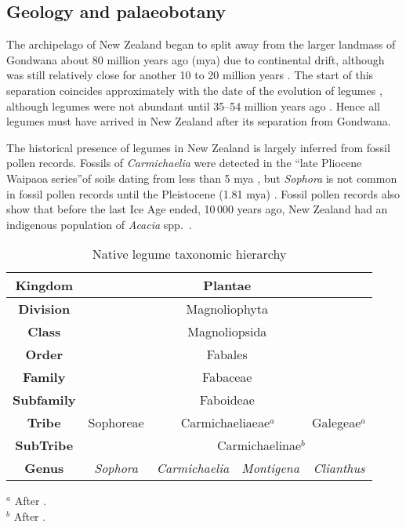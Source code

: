 \subsection{Geology and palaeobotany}

The archipelago of New Zealand began to split away from the larger
landmass of Gondwana about 80 million years ago (mya) due to
continental drift, although was still relatively close for another
10 to 20 million years \citep{Cooper93,Stevens95}. The start of this
separation coincides approximately with the date of the evolution of
legumes \citep{Sprent94}, although legumes were not abundant until
35--54 million years ago  \citep{Doyle03}. Hence all legumes must
have arrived in New Zealand after its separation from Gondwana.

The historical presence of legumes in New Zealand is largely
inferred from fossil pollen records. Fossils of \emph{Carmichaelia}
were detected in  the ``late Pliocene Waipaoa series''of soils
dating from less than 5 mya \citep{Oliver28}, but \emph{Sophora} is
not common in fossil pollen records until the Pleistocene (1.81 mya)
\citep{Hurr99}. Fossil pollen records also show that before the last
Ice Age ended, 10\,000 years ago, New Zealand had an indigenous
population of \emph{Acacia} spp.~\citep{Mildenhall72,Lee01}.

\begin{table} [tbp]
\caption{Native legume taxonomic hierarchy}
  \centering
  \begin{tabular}{|c|c|c|c|c|}
    \hline \textbf{Kingdom}     & \multicolumn{4}{c|}{Plantae} \\
    \hline \textbf{Division}    & \multicolumn{4}{c|}{Magnoliophyta} \\
    \hline \textbf{Class}       & \multicolumn{4}{c|}{Magnoliopsida} \\
    \hline \textbf{Order}       & \multicolumn{4}{c|}{Fabales} \\
    \hline \textbf{Family}      & \multicolumn{4}{c|}{Fabaceae} \\
    \hline \textbf{Subfamily}   & \multicolumn{4}{c|}{Faboideae} \\
    \hline \textbf{Tribe}       & Sophoreae         & \multicolumn{2}{c|}{Carmichaeliaeae$^a$} & Galegeae$^a$    \\
    \hline \textbf{SubTribe}    &                   & \multicolumn{3}{c|}{Carmichaelinae$^b$}              \\
    \hline \textbf{Genus}       & \emph{Sophora}    & \emph{Carmichaelia} & \emph{Montigena} & \emph{Clianthus}  \\
    \hline
  \end{tabular}

   \label{taxbox-Native}
  \medskip
  \raggedright
  {\footnotesize
\hskip 1cm $^a$ After \citet{Pohill81-Carm}. \\
\hskip 1cm $^b$ After \citet{Wagstaff99}. \\}
\end{table}

